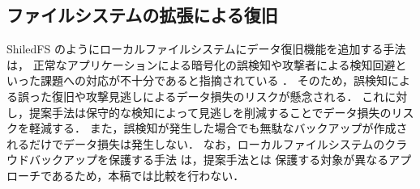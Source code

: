 \subsection{ファイルシステムの拡張による復旧}
ShiledFS \cite{shieldFS} のようにローカルファイルシステムにデータ復旧機能を追加する手法は，
正常なアプリケーションによる暗号化の誤検知や攻撃者による検知回避といった課題への対応が不十分であると指摘されている \cite{han2020effectiveness,css2024-enomoto}．
そのため，誤検知による誤った復旧や攻撃見逃しによるデータ損失のリスクが懸念される．
これに対し，提案手法は保守的な検知によって見逃しを削減することでデータ損失のリスクを軽減する．
また，誤検知が発生した場合でも無駄なバックアップが作成されるだけでデータ損失は発生しない．
なお，ローカルファイルシステムのクラウドバックアップを保護する手法 \cite{matos2018rockfs} は，提案手法とは
保護する対象が異なるアプローチであるため，本稿では比較を行わない．
